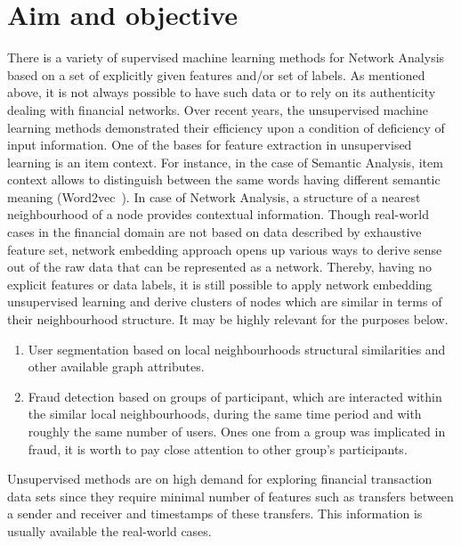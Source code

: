 \section{Aim and objective}
There is a variety of supervised machine learning methods for Network Analysis based on a set of explicitly given features and/or set of labels. As mentioned above, it is not always possible to have such data or to rely on its authenticity dealing with financial networks. Over recent years, the unsupervised machine learning methods demonstrated their efficiency upon a condition of deficiency of input information. 
One of the bases for feature extraction in unsupervised learning is an item context. For instance, in the case of Semantic Analysis, item context allows to distinguish between the same words having different semantic meaning (Word2vec~\cite{SKIP-GRAM-MODEL}). In case of Network Analysis, a structure of a nearest neighbourhood of a node provides contextual information. 
Though real-world cases in the financial domain are not based on data described by exhaustive feature set, network embedding approach opens up various ways to derive sense out of the raw data that can be represented as a network. Thereby, having no explicit features or data labels, it is still possible to apply network embedding unsupervised learning and derive clusters of nodes which are similar in terms of their neighbourhood structure. It may be highly relevant for the purposes below.
\begin{enumerate}
\item User segmentation based on local neighbourhoods structural similarities and other available graph attributes.
\item Fraud detection based on groups of participant, which are interacted within the similar local neighbourhoods, during the same time period and with roughly the same number of users. Ones one from a group was implicated in fraud, it is worth to pay close attention to other group's participants.
 \end{enumerate}
Unsupervised methods are on high demand for exploring financial transaction data sets since they require minimal number of features such as transfers between a sender and receiver and timestamps of these transfers. This information is usually available the real-world cases.

